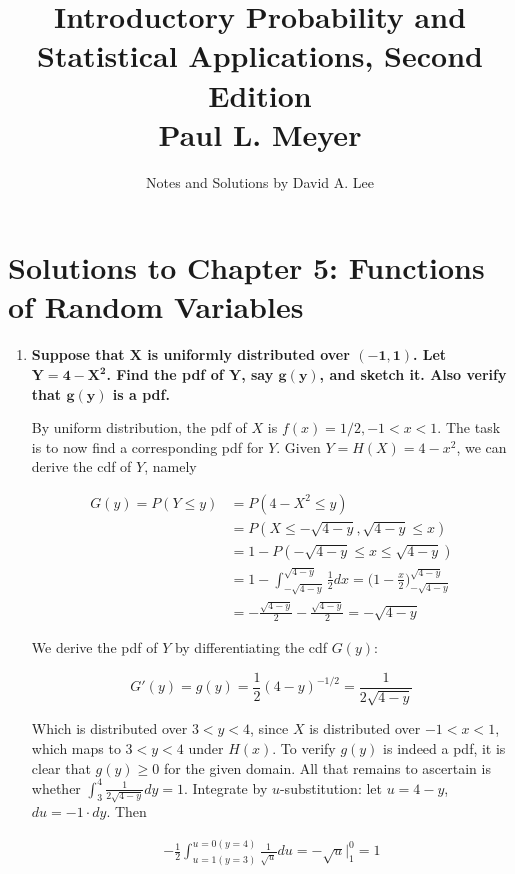 \documentclass[10pt, oneside]{article}
\title{Introductory Probability and Statistical Applications, Second Edition \\
\large{Paul L. Meyer}}
\author{Notes and Solutions by David A. Lee \\ }
\date{}							%
\begin{document}
\maketitle
\section*{Solutions to Chapter 5: Functions of Random Variables}

\begin{enumerate}[label=5.\arabic*]
\itemsep0em 
\item  \begin{tcolorbox}[
  colback=Cerulean!5!white,
  colframe=Cerulean!75!black]
\textbf{Suppose that $\bm{X}$ is uniformly distributed over $\bm{(-1,1)}$. Let $\bm{Y = 4 - X^2}$. Find the pdf of $\bm{Y}$, say $\bm{g(y)}$, and sketch it. Also verify that $\bm{g(y)}$ is a pdf.}
\end{tcolorbox}

By uniform distribution, the pdf of $X$ is $f(x) = 1/2, -1 < x < 1$. The task is to now find a corresponding pdf for $Y$. Given $Y = H(X) = 4 - x^2$, we can derive the cdf of $Y$, namely

\begin{align*}
G(y) = P(Y \leq y) &= P(4 - X^2 \leq y) \\
&= P(X \leq -\sqrt{4-y}, \sqrt{4-y} \leq x) \\
&= 1 - P(-\sqrt{4-y} \leq x \leq \sqrt{4-y}) \\
&= 1 - \int^{\sqrt{4-y}}_{-\sqrt{4-y}} \frac{1}{2} dx = \Big( 1 - \frac{x}{2} \Big)^{\sqrt{4-y}}_{-\sqrt{4-y}} \\
&= -\frac{\sqrt{4-y}}{2} - \frac{\sqrt{4-y}}{2} = -\sqrt{4-y}
\end{align*}

We derive the pdf of $Y$ by differentiating the cdf $G(y)$:

\[ G'(y) = g(y) = \frac{1}{2} (4-y)^{-1/2} = \boxed{ \frac{1}{2 \sqrt{4-y}} } \]

Which is distributed over $3 < y < 4$, since $X$ is distributed over $-1 < x < 1$, which maps to $3 < y < 4$ under $H(x)$. To verify $g(y)$ is indeed a pdf, it is clear that $g(y) \geq 0$ for the given domain. All that remains to ascertain is whether $\int^4_3 \frac{1}{2 \sqrt{4-y}} dy = 1$. Integrate by $u$-substitution: let $u = 4 - y$, $du = -1 \cdot dy$. Then

\begin{align*}
-\frac{1}{2} \int^{u = 0 (y = 4)}_{u = 1 (y = 3)} \frac{1}{\sqrt{u}} du = -\sqrt{u} \Big|^0_1 = \boxed{1}
\end{align*}


\end{enumerate}
\end{document}
